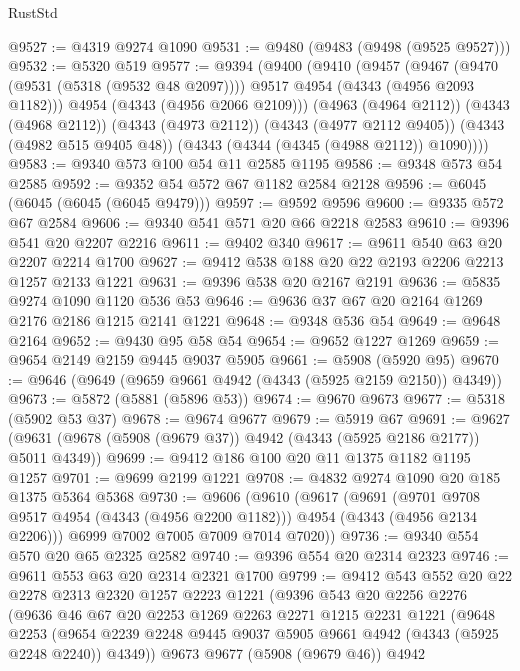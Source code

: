 \begin{lexlean}{RustStd}
\begin{coremodule}
@9527 := @4319 @9274 @1090
@9531 := @9480 (@9483 (@9498 (@9525 @9527)))
@9532 := @5320 @519
@9577 := @9394
    (@9400
      (@9410
        (@9457
          (@9467 (@9470 (@9531 (@5318 (@9532 @48 @2097)))) @9517 @4954 (@4343 (@4956 @2093 @1182)))
          @4954
          (@4343 (@4956 @2066 @2109)))
        (@4963 (@4964 @2112))
        (@4343 (@4968 @2112))
        (@4343 (@4973 @2112))
        (@4343 (@4977 @2112 @9405))
        (@4343 (@4982 @515 @9405 @48))
        (@4343 (@4344 (@4345 (@4988 @2112)) @1090))))
@9583 := @9340 @573 @100 @54 @11 @2585 @1195
@9586 := @9348 @573 @54 @2585
@9592 := @9352 @54 @572 @67 @1182 @2584 @2128
@9596 := @6045 (@6045 (@6045 (@6045 @9479)))
@9597 := @9592 @9596
@9600 := @9335 @572 @67 @2584
@9606 := @9340 @541 @571 @20 @66 @2218 @2583
@9610 := @9396 @541 @20 @2207 @2216
@9611 := @9402 @340
@9617 := @9611 @540 @63 @20 @2207 @2214 @1700
@9627 := @9412 @538 @188 @20 @22 @2193 @2206 @2213 @1257 @2133 @1221
@9631 := @9396 @538 @20 @2167 @2191
@9636 := @5835 @9274 @1090 @1120 @536 @53
@9646 := @9636 @37 @67 @20 @2164 @1269 @2176 @2186 @1215 @2141 @1221
@9648 := @9348 @536 @54
@9649 := @9648 @2164
@9652 := @9430 @95 @58 @54
@9654 := @9652 @1227 @1269
@9659 := @9654 @2149 @2159 @9445 @9037 @5905
@9661 := @5908 (@5920 @95)
@9670 := @9646 (@9649 (@9659 @9661 @4942 (@4343 (@5925 @2159 @2150)) @4349))
@9673 := @5872 (@5881 (@5896 @53))
@9674 := @9670 @9673
@9677 := @5318 (@5902 @53 @37)
@9678 := @9674 @9677
@9679 := @5919 @67
@9691 := @9627 (@9631 (@9678 (@5908 (@9679 @37)) @4942 (@4343 (@5925 @2186 @2177)) @5011 @4349))
@9699 := @9412 @186 @100 @20 @11 @1375 @1182 @1195 @1257
@9701 := @9699 @2199 @1221
@9708 := @4832 @9274 @1090 @20 @185 @1375 @5364 @5368
@9730 := @9606
    (@9610
      (@9617
        (@9691
          (@9701 @9708 @9517 @4954 (@4343 (@4956 @2200 @1182)))
          @4954
          (@4343 (@4956 @2134 @2206)))
        @6999
        @7002
        @7005
        @7009
        @7014
        @7020))
@9736 := @9340 @554 @570 @20 @65 @2325 @2582
@9740 := @9396 @554 @20 @2314 @2323
@9746 := @9611 @553 @63 @20 @2314 @2321 @1700
@9799 := @9412
    @543
    @552
    @20
    @22
    @2278
    @2313
    @2320
    @1257
    @2223
    @1221
    (@9396
      @543
      @20
      @2256
      @2276
      (@9636
        @46
        @67
        @20
        @2253
        @1269
        @2263
        @2271
        @1215
        @2231
        @1221
        (@9648
          @2253
          (@9654 @2239 @2248 @9445 @9037 @5905 @9661 @4942 (@4343 (@5925 @2248 @2240)) @4349))
        @9673
        @9677
        (@5908 (@9679 @46))
        @4942

\end{coremodule}
\end{lexlean}
